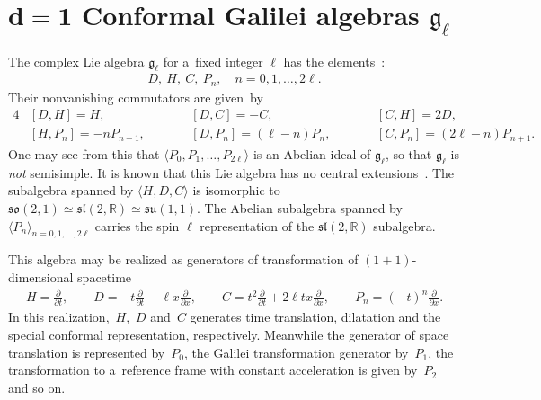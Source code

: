 \section[$d=1$ Conformal Galilei algebras ${\mathfrak g}_{\ell}$]{$\boldsymbol{d=1}$ Conformal Galilei algebras $\boldsymbol{{\mathfrak g}_{\ell}}$}

The complex Lie algebra $ {\mathfrak g}_{\ell} $ for a~f\/ixed integer $ \ell $ has the elements~\cite{NdORM1}:
\begin{gather*}
D, \ H, \ C, \ P_n, \quad n = 0, 1,   \dots,   2\ell.
\end{gather*}
Their nonvanishing commutators are given~by
\begin{alignat}{4}
& [D, H] = H, \qquad & & [D, C] = - C, \qquad & & [C, H] = 2D,& \nonumber\\
& [H, P_n] = -n P_{n-1}, \qquad & & [D, P_n] = (\ell-n) P_n, \qquad & & [C, P_n] = (2\ell-n) P_{n+1}.&\label{nonvanishing-commutators}
\end{alignat}
One may see from this that $ \langle   P_0, P_1, \dots, P_{2\ell}   \rangle $ is an Abelian ideal of $ {\mathfrak
g}_{\ell} $, so that $ {\mathfrak g}_{\ell} $ is \textit{not} semisimple.
It is known that this Lie algebra has no central extensions~\cite{MT}.
The subalgebra spanned by $ \langle
 H, D, C
\rangle $ is isomorphic to $ {\mathfrak{so}}(2,1) \simeq {\mathfrak{sl}}(2,{\mathbb R}) \simeq {\mathfrak{su}}(1,1)$.
The Abelian subalgebra spanned by $ \langle
P_n
\rangle_{n=0, 1, \dots, 2\ell} $ carries the spin $ \ell $ representation of the $ {\mathfrak{sl}}(2,{\mathbb R})$
subalgebra.

This algebra may be realized as generators of transformation of $(1+1)$-dimensional spacetime
\begin{gather*}
H = \frac{\partial}{\partial t},
\qquad
D =-t\frac{\partial}{\partial t} -\ell x \frac{\partial}{\partial x},
\qquad
C = t^2 \frac{\partial}{\partial t} + 2 \ell tx \frac{\partial}{\partial x},
\qquad
P_n = (-t)^n \frac{\partial}{\partial x}.
\end{gather*}
In this realization,~$H$,~$D$ and~$C$ generates time translation, dilatation and the special conformal representation,
respectively.
Meanwhile the generator of space translation is represented by~$P_0$, the Galilei transformation generator by~$P_1$,
the transformation to a~reference frame with constant acceleration is given by~$P_2$ and so on.

